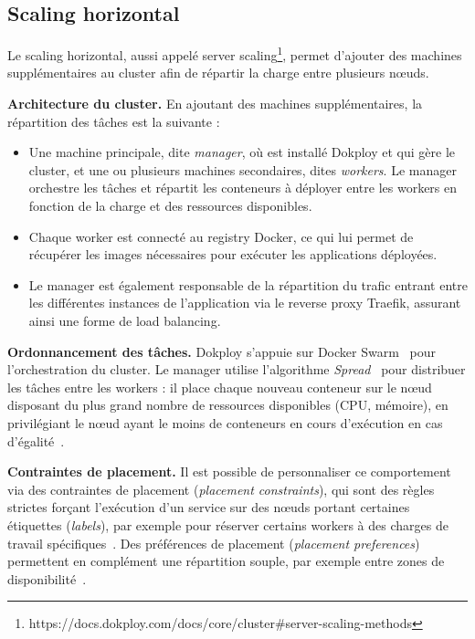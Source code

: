 \documentclass{rapportClass} %
\begin{document}
\subsection{Scaling horizontal}
Le scaling horizontal, aussi appelé server scaling\footnote{https://docs.dokploy.com/docs/core/cluster\#server-scaling-methods},
permet d'ajouter des machines supplémentaires au cluster afin de répartir la charge entre plusieurs nœuds.

\smallskip
\textbf{Architecture du cluster.}
En ajoutant des machines supplémentaires, la répartition des tâches est la suivante :
\begin{itemize}
\item Une machine principale, dite \textit{manager}, où est installé Dokploy et qui gère le cluster, et une ou plusieurs 
machines secondaires, dites \textit{workers}. 
Le manager orchestre les tâches et répartit les conteneurs à déployer 
entre les workers en fonction de la charge et des ressources disponibles.

\item Chaque worker est connecté au registry Docker, ce qui lui permet de récupérer 
les images nécessaires pour exécuter les applications déployées.

\item Le manager est également responsable de la répartition du trafic entrant entre
les différentes instances de l'application via le reverse proxy Traefik, 
assurant ainsi une forme de load balancing.
\end{itemize}   

\smallskip
\textbf{Ordonnancement des tâches.}
Dokploy s'appuie sur Docker Swarm~\cite{dockerswarm} pour l'orchestration
du cluster. Le manager utilise l'algorithme \textit{Spread}~\cite{dockerscheduler}
pour distribuer les tâches entre les workers : il place chaque nouveau conteneur
sur le nœud disposant du plus grand nombre de ressources disponibles (CPU, mémoire),
en privilégiant le nœud ayant le moins de conteneurs en cours d'exécution en cas
d'égalité~\cite{dockerscheduler}.

\smallskip
\textbf{Contraintes de placement.}
Il est possible de personnaliser ce comportement via des contraintes de placement
(\textit{placement constraints}), qui sont des règles strictes forçant l'exécution
d'un service sur des nœuds portant certaines étiquettes (\textit{labels}), par exemple
pour réserver certains workers à des charges de travail spécifiques~\cite{dockerservices}.
Des préférences de placement (\textit{placement preferences}) permettent en
complément une répartition souple, par exemple entre zones de disponibilité~\cite{dockerservices}.
\end{document}
